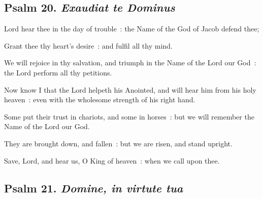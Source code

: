 \subsection{Psalm 20. \textit{Exaudiat te Dominus}}


 Lord hear thee in the day of trouble~: the Name of the God of Jacob defend thee;\par
{}
Grant thee thy heart's desire~: and fulfil all thy mind.\par
{}We will rejoice in thy salvation, and triumph in the Name of the Lord our God~: the Lord perform all thy petitions.\par
{}Now know I that the Lord helpeth his Anointed, and will hear him from his holy heaven~: even with the wholesome strength of his right hand.\par
{}Some put their trust in chariots, and some in horses~: but we will remember the Name of the Lord our God.\par
{}They are brought down, and fallen~: but we are risen, and stand upright.\par
{}Save, Lord, and hear us, O King of heaven~: when we call upon thee.\par

\subsection{Psalm 21. \textit{Domine, in virtute tua}}


